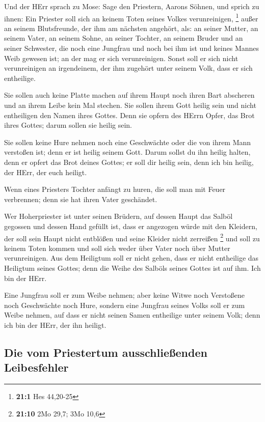  Und der HErr sprach zu Mose: Sage den Priestern, Aarons
Söhnen, und sprich zu ihnen: Ein Priester soll sich an keinem Toten
seines Volkes verunreinigen, \footnote{\textbf{21:1} Hes 44,20-25}
 außer an seinem Blutsfreunde, der ihm am nächsten
angehört, als: an seiner Mutter, an seinem Vater, an seinem Sohne, an
seiner Tochter, an seinem Bruder  und an seiner Schwester,
die noch eine Jungfrau und noch bei ihm ist und keines Mannes Weib
gewesen ist; an der mag er sich verunreinigen.  Sonst soll
er sich nicht verunreinigen an irgendeinem, der ihm zugehört unter
seinem Volk, dass er sich entheilige.

 Sie sollen auch keine Platte machen auf ihrem Haupt noch
ihren Bart abscheren und an ihrem Leibe kein Mal stechen. 
Sie sollen ihrem Gott heilig sein und nicht entheiligen den Namen ihres
Gottes. Denn sie opfern des HErrn Opfer, das Brot ihres Gottes; darum
sollen sie heilig sein.

 Sie sollen keine Hure nehmen noch eine Geschwächte oder
die von ihrem Mann verstoßen ist; denn er ist heilig seinem Gott.
 Darum sollst du ihn heilig halten, denn er opfert das
Brot deines Gottes; er soll dir heilig sein, denn ich bin heilig, der
HErr, der euch heiligt.

 Wenn eines Priesters Tochter anfängt zu huren, die soll
man mit Feuer verbrennen; denn sie hat ihren Vater geschändet.

 Wer Hoherpriester ist unter seinen Brüdern, auf dessen
Haupt das Salböl gegossen und dessen Hand gefüllt ist, dass er angezogen
würde mit den Kleidern, der soll sein Haupt nicht entblößen und seine
Kleider nicht zerreißen \footnote{\textbf{21:10} 2Mo 29,7; 3Mo 10,6}
 und soll zu keinem Toten kommen und soll sich weder über
Vater noch über Mutter verunreinigen.  Aus dem Heiligtum
soll er nicht gehen, dass er nicht entheilige das Heiligtum seines
Gottes; denn die Weihe des Salböls seines Gottes ist auf ihm. Ich bin
der HErr.

 Eine Jungfrau soll er zum Weibe nehmen; 
aber keine Witwe noch Verstoßene noch Geschwächte noch Hure, sondern
eine Jungfrau seines Volks soll er zum Weibe nehmen,  auf
dass er nicht seinen Samen entheilige unter seinem Volk; denn ich bin
der HErr, der ihn heiligt.

\hypertarget{die-vom-priestertum-ausschlieuxdfenden-leibesfehler}{%
\subsection{Die vom Priestertum ausschließenden
Leibesfehler}\label{die-vom-priestertum-ausschlieuxdfenden-leibesfehler}}


